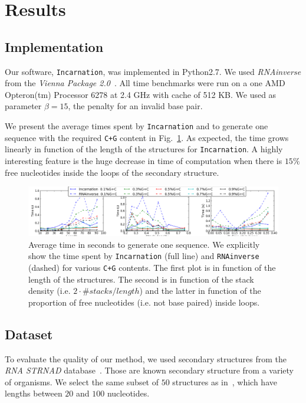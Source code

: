 \section{Results}
\label{sec:results}

\subsection{Implementation}
\label{sec:implementation}
Our software, \texttt{Incarnation}, was implemented in Python2.7. We used
\emph{RNAinverse} from the \textit{Vienna Package 2.0}~\cite{Hofacker:1994}.
All time benchmarks were run on a one AMD Opteron(tm) Processor 6278  at 2.4 GHz with cache of 512 KB.
 We used as parameter $\beta=15$, the penalty for an invalid base pair.



We present the average times spent by \texttt{Incarnation} and \RNAinverse
 to generate one sequence
with the required \texttt{C+G} content in Fig.~\ref{fig:time}. As expected, the time grows linearly
in function of the length of the structures for \texttt{Incarnation}.  A highly interesting feature
is the huge decrease in time of computation when there is $15\%$ free 
nucleotides inside the loops of the secondary structure.

\begin{figure}[ht!]
	\centering
	\includegraphics[width=\textwidth]{Figures/time_rnastrand_clustered_rnainverse_100samples_fix}
	\caption{Average time in seconds to generate one sequence. We explicitly show 
	the time spent by \texttt{Incarnation} (full line) and \texttt{RNAinverse} (dashed) for various \texttt{C+G} contents. The first plot is in function
	of the length of the structures. The second is in function of the stack
	density (i.e. $2\cdot\#stacks/length$) and the latter in function of 
	the proportion of free nucleotides (i.e. not base paired) inside loops.}
	\label{fig:time}	
\end{figure}



\subsection{Dataset}
To evaluate the quality of our method, we used secondary
structures from the \textit{RNA STRNAD} database~\cite{andronescu2008rna}.
Those are known secondary structure from a variety of organisms.
We select the same subset of $50$ structures as in~\cite{Levin:2012kx}, 
which have lengths between $20$ and $100$ nucleotides. 

